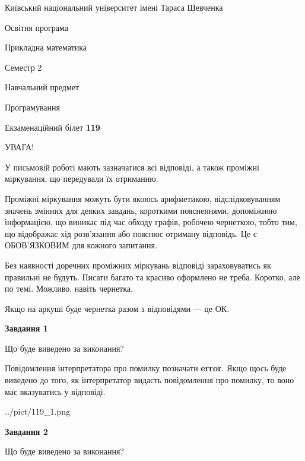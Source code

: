 \documentclass[12pt, ukrainian]{article}
\begin{document}
{{\begin {small}\par
{ \center  Київський національний університет імені Тараса Шевченка \par}
{\parbox {5 cm}{Освітня програма \hfill}{\parbox {7 cm}{Прикладна математика \hfill}}\parbox {6 cm}{\hfill Семестр 2}}\par
{\parbox {5 cm} {Навчальний предмет \hfill}\parbox {7 cm}{Програмування \hfill}\parbox {6cm}{\hfill}\par}\vspace{-7pt} \end{small}}{\center Екзаменаційний білет \No \textbf
{ 119 }\par}}
{
\begin {large}
УВАГА!

У письмовій роботі мають зазначатися всі відповіді, а також проміжні міркування, що передували їх отриманню.

Проміжні міркування можуть бути якоюсь арифметикою, відслідковуванням зна\-чень змінних для деяких завдань,
короткими поясненнями, допоміжною інформацією, що виникає під час обходу графів, робочею чернеткою,
тобто тим, що відображає хід розв’язання або пояснює отриману відповідь.
Це є ОБОВ’ЯЗКОВИМ для кожного запитання.

Без наявності доречних проміжних міркувань відповіді зараховуватись як правиль\-ні не будуть.
Писати багато та красиво оформлено не треба. Коротко, але по темі. Можли\-во, навіть чернетка.

Якщо на аркуші буде чернетка разом з відповідями --- це ОК.

\newpage

{\begin {center}\textbf{Завдання 1}\end {center}}\par
Що буде виведено за виконання?

Повідомлення інтерпретатора про помилку позначати \textbf{error}.
Якщо щось буде виведено до того, як інтерпретатор видасть повідомлення про помилку, 
то воно має вказуватись у відповіді. \par


\begin{center}
	{../pict/119_1.png}
\end{center}
\newpage

{\begin {center}\textbf{Завдання 2}\end {center}}\par
Що буде виведено за виконання?


\end{large}}
\end{document}
